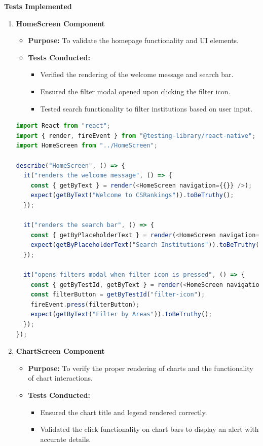 \documentclass[12pt]{article}
\begin{document}
\textbf{Tests Implemented}
\begin{enumerate}
    \item \textbf{HomeScreen Component}
    \begin{itemize}
        \item \textbf{Purpose:} To validate the homepage functionality and UI elements.
        \item \textbf{Tests Conducted:}
        \begin{itemize}
            \item Verified the rendering of the welcome message and search bar.
            \item Ensured the filter modal opened upon clicking the filter icon.
            \item Tested search functionality to filter institutions based on user input.
        \end{itemize}
    \end{itemize}

\begin{lstlisting}[language=JavaScript, caption={HomeScreen Tests}, label={lst:HomeScreen}]
import React from "react";
import { render, fireEvent } from "@testing-library/react-native";
import HomeScreen from "../HomeScreen";

describe("HomeScreen", () => {
  it("renders the welcome message", () => {
    const { getByText } = render(<HomeScreen navigation={{}} />);
    expect(getByText("Welcome to CSRankings")).toBeTruthy();
  });

  it("renders the search bar", () => {
    const { getByPlaceholderText } = render(<HomeScreen navigation={{}} />);
    expect(getByPlaceholderText("Search Institutions")).toBeTruthy();
  });

  it("opens filters modal when filter icon is pressed", () => {
    const { getByTestId, getByText } = render(<HomeScreen navigation={{}} />);
    const filterButton = getByTestId("filter-icon");
    fireEvent.press(filterButton);
    expect(getByText("Filter by Areas")).toBeTruthy();
  });
});
\end{lstlisting}

    \bigskip
    \item \textbf{ChartScreen Component}
    \begin{itemize}
        \item \textbf{Purpose:} To verify the proper rendering of charts and the functionality of chart interactions.
        \item \textbf{Tests Conducted:}
        \begin{itemize}
            \item Ensured the chart title and legend rendered correctly.
            \item Validated the click functionality on chart bars to display an alert with accurate details.
        \end{itemize}
    \end{itemize}


\end{enumerate}
\end{document}
